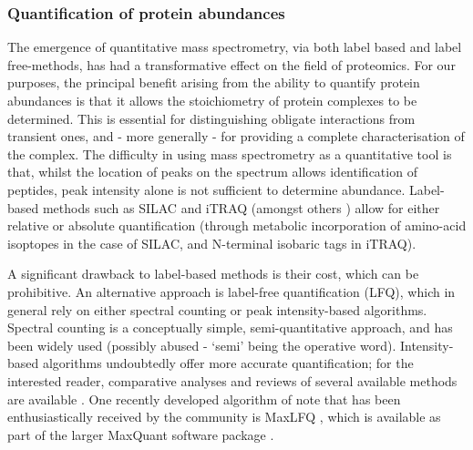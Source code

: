 \documentclass[a4paper,11pt,twoside,openright]{scrbook}
\begin{document}
\subsubsection{Quantification of protein abundances}
The emergence of quantitative mass spectrometry, via both label based and label free-methods, has had a transformative effect on the field of proteomics. For our purposes, the principal benefit arising from the ability to quantify protein abundances is that it allows the stoichiometry of protein complexes to be determined. This is essential for distinguishing obligate interactions from transient ones, and - more generally - for providing a complete characterisation of the complex. The difficulty in using mass spectrometry as a quantitative tool is that, whilst the location of peaks on the spectrum allows identification of peptides, peak intensity alone is not sufficient to determine abundance. Label-based methods such as SILAC \cite{Ong2002a} and iTRAQ \cite{Ross2004} (amongst others \cite{Gygi1999,Thompson2003}) allow for either relative or absolute quantification (through metabolic incorporation of amino-acid isoptopes in the case of SILAC, and N-terminal isobaric tags in iTRAQ).

A significant drawback to label-based methods is their cost, which can be prohibitive. An alternative approach is label-free quantification (LFQ), which in general rely on either spectral counting \cite{Liu2004,Zybailov2005} or peak intensity-based algorithms. Spectral counting is a conceptually simple, semi-quantitative approach, and has been widely used (possibly abused \cite{Lundgren2010} - `semi' being the operative word). Intensity-based algorithms undoubtedly offer more accurate quantification; for the interested reader, comparative analyses and reviews of several available methods are available \cite{Nahnsen2013,Fabre2014}. One recently developed algorithm of note that has been enthusiastically received by the community is MaxLFQ \cite{Cox2014}, which is available as part of the larger MaxQuant software package \cite{Cox2008}.


\end{document}
